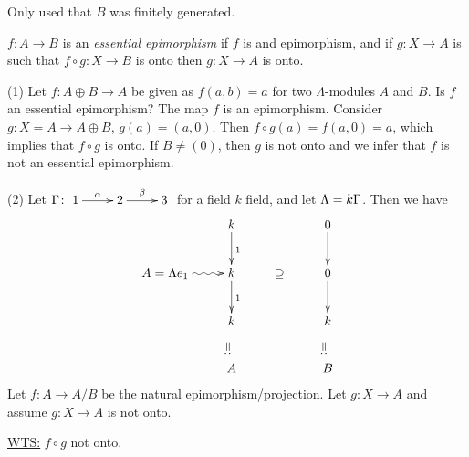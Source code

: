 \begin{note}
Only used that $B$ was finitely generated.
\end{note}

\begin{defin}
$f \colon A \to B$ is an \emph{essential epimorphism} if $f$ is and
epimorphism, and if $g\colon X \to A$ is such that $f \circ g \colon X \to B$ is
onto then $g\colon X \to A$ is onto. 
\end{defin}
\begin{exam}
  (1) Let $f\colon A \oplus B \to A$ be given as $f(a,b) = a$ for two
  $\Lambda$-modules $A$ and $B$. Is $f$ an essential epimorphism? The
  map $f$ is an epimorphism. Consider $g\colon X= A \to A \oplus B$,
  $g(a)=(a, 0)$. Then $f \circ g(a) = f(a,0)=a$, which implies that $f
  \circ g$ is onto. If $B \neq (0)$, then $g$ is not onto and we infer
  that $f$ is not an  essential epimorphism.

(2) Let $\G \colon \xymatrix{1\ar[r]^\alpha & 2\ar[r]^\beta & 3}$ for a
field $k$ field, and let $\Lambda = k\Gamma$. Then we have
\[\xymatrix{
&                             k\ar[d]^1 && 0\ar[d]\\
A = \Lambda e_1 \ar@{~>}[r] & k\ar[d]^1 &\supseteq& 0\ar[d]\\
 & k\ar@{}[d]|-*[@]{=:} && k\ar@{}[d]|-*[@]{=:}\\
 & A && B
}\]
Let $f\colon A \to A/B$ be the natural epimorphism/projection. Let $g\colon X
\to A$ and assume $g\colon X \to A$ is not onto.

\underline{WTS:} $f \circ g$ not onto.\\


\end{exam}
